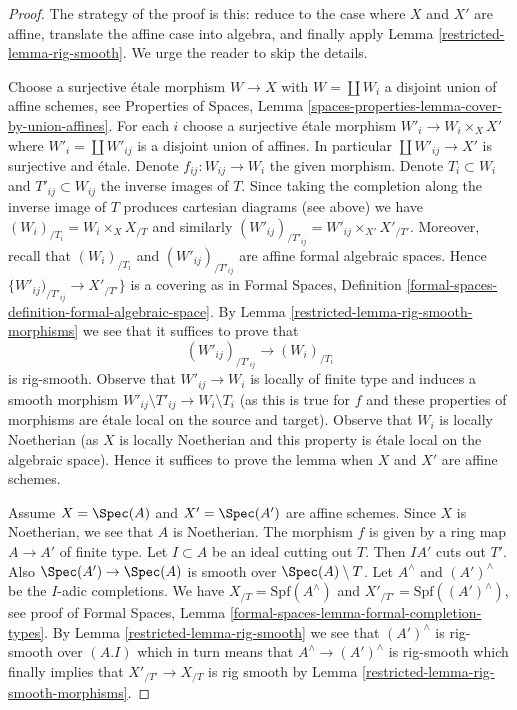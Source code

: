\begin{proof}

The strategy of the proof is this: reduce to the case where $X$ and $X'$
are affine, translate the affine case into algebra, and finally apply
Lemma \ref{restricted-lemma-rig-smooth}. We urge the reader to skip the details.

\medskip\noindent
Choose a surjective \'etale morphism $W \to X$ with $W = \coprod W_i$
a disjoint union of affine schemes, see Properties of Spaces, Lemma
\ref{spaces-properties-lemma-cover-by-union-affines}.
For each $i$ choose a surjective \'etale morphism $W'_i \to W_i \times_X X'$
where $W'_i = \coprod W'_{ij}$ is a disjoint union of affines.
In particular $\coprod W'_{ij} \to X'$ is surjective and \'etale.
Denote $f_{ij} : W_{ij} \to W_i$ the given morphism.
Denote $T_i \subset W_i$ and $T'_{ij} \subset W_{ij}$ the inverse
images of $T$. Since taking the completion along the inverse
image of $T$ produces cartesian diagrams (see above) we
have $(W_i)_{/T_i} = W_i \times_X X_{/T}$ and similarly
$(W'_{ij})_{/T'_{ij}} = W'_{ij} \times_{X'} X'_{/T'}$.
Moreover, recall that $(W_i)_{/T_i}$ and $(W'_{ij})_{/T'_{ij}}$
are affine formal algebraic spaces.
Hence $\{W'_{ij})_{/T'_{ij}} \to X'_{/T'}\}$ is a covering
as in Formal Spaces, Definition
\ref{formal-spaces-definition-formal-algebraic-space}.
By Lemma \ref{restricted-lemma-rig-smooth-morphisms}
we see that it suffices to prove that
$$
(W'_{ij})_{/T'_{ij}} \longrightarrow (W_i)_{/T_i}
$$
is rig-smooth. Observe that $W'_{ij} \to W_i$
is locally of finite type and induces a smooth morphism
$W'_{ij} \setminus T'_{ij} \to W_i \setminus T_i$
(as this is true for $f$ and these properties of morphisms are
\'etale local on the source and target).
Observe that $W_i$ is locally Noetherian (as $X$ is locally Noetherian
and this property is \'etale local on the algebraic space).
Hence it suffices to prove the lemma when
$X$ and $X'$ are affine schemes.

\medskip\noindent
Assume $X = \Spec(A)$ and $X' = \Spec(A')$ are affine schemes.
Since $X$ is Noetherian, we see that $A$ is Noetherian.
The morphism $f$ is given by a ring map $A \to A'$ of finite type.
Let $I \subset A$ be an ideal cutting out $T$. Then $IA'$ cuts out $T'$.
Also $\Spec(A') \to \Spec(A)$ is smooth over $\Spec(A) \setminus T$.
Let $A^\wedge$ and $(A')^\wedge$ be the $I$-adic
completions. We have $X_{/T} = \text{Spf}(A^\wedge)$ and
$X'_{/T'} = \text{Spf}((A')^\wedge)$, see proof of
Formal Spaces, Lemma
\ref{formal-spaces-lemma-formal-completion-types}.
By Lemma \ref{restricted-lemma-rig-smooth} we see that
$(A')^\wedge$ is rig-smooth over $(A. I)$
which in turn means that $A^\wedge \to (A')^\wedge$ is rig-smooth which
finally implies that $X'_{/T'} \to X_{/T}$ is rig smooth by
Lemma \ref{restricted-lemma-rig-smooth-morphisms}.
\end{proof}

